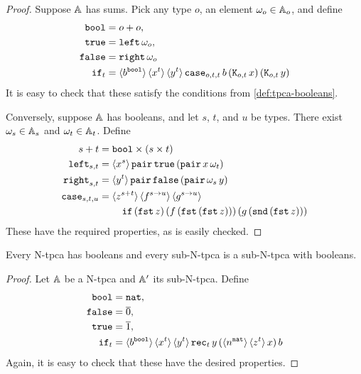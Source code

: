 \begin{proof}
  Suppose $\AA$ has sums. Pick any type $o$, an element $\omega_o \in
  \Atyp{o}$, and define
  \begin{align*}
    \ttbool &= o + o, \\
    \combTrue &= \combLeft\,\omega_o, \\
    \combFalse &= \combRight\,\omega_o \\
    \combIf_t &= \tpcalam{b}{\ttbool}
                 \tpcalam{x}{t}
                 \tpcalam{y}{t}
                 \combCase_{o,t,t}\,b\,(\combK_{o,t}\,x)\,(\combK_{o,t}\,y)
  \end{align*}
  It is easy to check that these satisfy the conditions from
  \cref{def:tpca-booleans}.

  Conversely, suppose $\AA$ has booleans, and let $s$, $t$, and $u$ be
  types. There exist $\omega_s \in \Atyp{s}$ and $\omega_t \in
  \Atyp{t}$. Define
  \begin{align*}
    s + t &= \ttbool \times (s \times t)\\
    \combLeft_{s,t} &=
      \tpcalam{x}{s}{\combPair\,\combTrue\,(\combPair\,x \, \omega_t)} \\
    \combRight_{s,t} &=
      \tpcalam{y}{t}{\combPair\,\combFalse\,(\combPair \, \omega_s \, y)} \\
    \combCase_{s,t,u} &=
     \begin{aligned}[t]
      &\tpcalam{z}{s+t}
      \tpcalam{f}{s \to u}
      \tpcalam{g}{s \to u} \\
      &\quad \combIf\,(\combFst\,z)\,
               (f\,(\combFst\,(\combFst\,z)))\,
               (g\,(\combSnd\,(\combFst\,z)))
      \end{aligned}
  \end{align*}
  These have the required properties, as is easily checked.
\end{proof}

\begin{proposition}
  \label{prop:n-tpca-booleans}
  Every N-tpca has booleans and every sub-N-tpca is a sub-N-tpca with
  booleans.
\end{proposition}

\begin{proof}
  Let $\AA$ be a N-tpca and $\subAA$ its sub-N-tpca. Define
  \begin{align*}
    \ttbool &= \ttnat, \\
    \combFalse &= \numeral{0}, \\
    \combTrue &= \numeral{1}, \\
    \combIf_t &= \tpcalam{b}{\ttbool}
                 \tpcalam{x}{t}
                 \tpcalam{y}{t}
                 \combRec_t \, y \,
                 (\tpcalam{n}{\ttnat} \tpcalam{z}{t} x) \, b
  \end{align*}
  Again, it is easy to check that these have the desired properties.
\end{proof}

